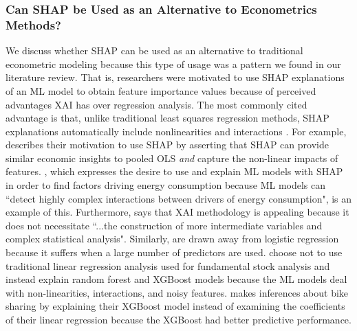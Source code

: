 \documentclass[12pt]{article}  %
\begin{document}
\subsubsection{Can SHAP be Used as an Alternative to Econometrics Methods?}
    We discuss whether SHAP can be used as an alternative to traditional econometric modeling because this type of usage was a pattern we found in our literature review. That is, researchers were motivated to use SHAP explanations of an ML model to obtain feature importance values because of perceived advantages XAI has over regression analysis. The most commonly cited advantage is that, unlike traditional least squares regression methods, SHAP explanations automatically include nonlinearities and interactions \cite{hanauer22boosting,berger2023supply,srivastava23energy,banulescu2023practical,li24roles}. For example, \cite{berger2023supply} describes their motivation to use SHAP by asserting that SHAP can provide similar economic insights to pooled OLS \emph{and} capture the non-linear impacts of features. \cite{srivastava23energy}, which expresses the desire to use and explain ML models with SHAP in order to find factors driving energy consumption because ML models can ``detect highly complex interactions between drivers of energy consumption", is an example of this. Furthermore, \cite{zhou23consumption} says that XAI methodology is appealing because it does not necessitate ``...the construction of more intermediate variables and complex statistical analysis". Similarly, \cite{banulescu2023practical} are drawn away from logistic regression because it suffers when a large number of predictors are used. \cite{hanauer22boosting} choose not to use traditional linear regression analysis used for fundamental stock analysis and instead explain random forest and XGBoost models because the ML models deal with non-linearities, interactions, and noisy features. \cite{li24roles} makes inferences about bike sharing by explaining their XGBoost model instead of examining the coefficients of their linear regression because the XGBoost had better predictive performance. 
\end{document}
